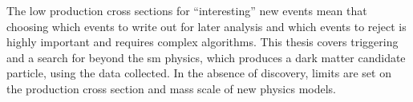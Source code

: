 The low production cross sections for ``interesting'' new events mean that 
choosing which events to write out for later analysis and which events to 
reject is highly important and requires complex algorithms. This thesis covers 
triggering and a search for beyond the \ac{sm} physics, which produces a dark 
matter candidate particle, using the data collected. In the absence of 
discovery, limits are set on the production cross section and mass scale of new 
physics models.




% 
% 
% 
% 
% 
% 
% 
